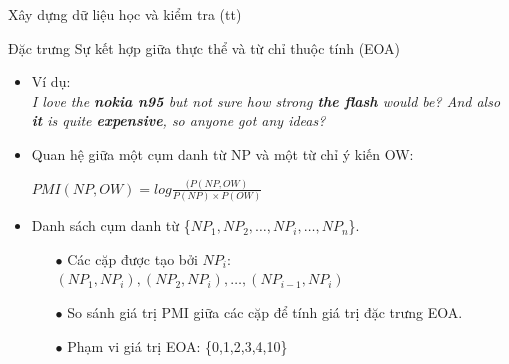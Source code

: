 \documentclass[9pt,xcolor=table,hyperref=unicode]{beamer}
\begin{document}
	\begin{frame}{Xây dựng dữ liệu học và kiểm tra (tt)}
		\begin{block}{Đặc trưng Sự kết hợp giữa thực thể và từ chỉ thuộc tính (EOA)}
			\begin{itemize}
				\item{Ví dụ:\\
				\textit{I love the \textbf{nokia n95} but not sure how strong \textbf{the flash} would be? And also \textbf{it} is quite \textbf{expensive}, so anyone got any ideas?}}				
				\item{Quan hệ giữa một cụm danh từ NP và một từ chỉ ý kiến OW: \\
					\begin{center}
						$PMI(NP,OW) = log\frac{(P(NP,OW)}{P(NP)\times P(OW)}$
					\end{center}}
				\item{Danh sách cụm danh từ \{$NP_{1},NP_{2},…,NP_{i},…,NP_{n}$\}.
					\begin{itemize}
						\item[$\bullet$]{Các cặp được tạo bởi $NP_{i}$: $(NP_{1},NP_{i}),(NP_{2},NP_{i}),…,(NP_{i-1},NP_{i})$}
						\item[$\bullet$]{So sánh giá trị PMI giữa các cặp để tính giá trị đặc trưng EOA.}
						\item[$\bullet$]{Phạm vi giá trị EOA: \{0,1,2,3,4,10\}}
					\end{itemize}}
			\end{itemize}
		\end{block}		
	\end{frame}
\end{document}
